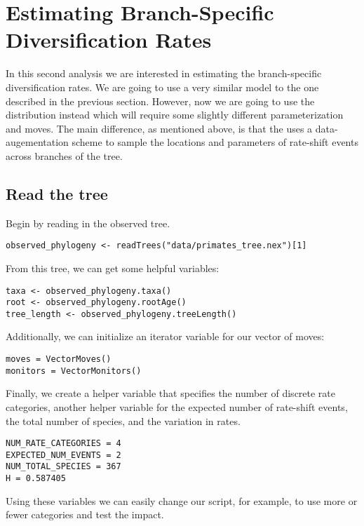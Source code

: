 







\bigskip
\section{Estimating Branch-Specific Diversification Rates}

In this second analysis we are interested in estimating the branch-specific diversification rates.
We are going to use a very similar model to the one described in the previous section.
However, now we are going to use the  distribution instead which will require some slightly different parameterization and moves.
The main difference, as mentioned above, is that the  uses a data-augementation scheme to sample the locations and parameters of rate-shift events across branches of the tree.

\subsection{Read the tree}

Begin by reading in the observed tree.

{\tt \begin{snugshade*}
\begin{lstlisting}
observed_phylogeny <- readTrees("data/primates_tree.nex")[1]
\end{lstlisting}
\end{snugshade*}}

From this tree, we can get some helpful variables:
{\tt \begin{snugshade*}
\begin{lstlisting}
taxa <- observed_phylogeny.taxa()
root <- observed_phylogeny.rootAge()
tree_length <- observed_phylogeny.treeLength()
\end{lstlisting}
\end{snugshade*}}

Additionally, we can initialize an iterator variable for our vector of moves:
{\tt \begin{snugshade*}
\begin{lstlisting}
moves = VectorMoves()
monitors = VectorMonitors()
\end{lstlisting}
\end{snugshade*}}

Finally, we create a helper variable that specifies the number of discrete rate categories, another helper variable for the expected number of rate-shift events, the total number of species, and the variation in rates.
{\tt \begin{snugshade*}
\begin{lstlisting}
NUM_RATE_CATEGORIES = 4
EXPECTED_NUM_EVENTS = 2
NUM_TOTAL_SPECIES = 367
H = 0.587405
\end{lstlisting}
\end{snugshade*}}
Using these variables we can easily change our script, for example, to use more or fewer categories and test the impact.




